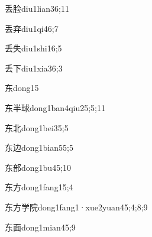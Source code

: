 \begin{verbete}{丢脸}{diu1lian3}{6;11}
\end{verbete}

\begin{verbete}{丢弃}{diu1qi4}{6;7}
\end{verbete}

\begin{verbete}{丢失}{diu1shi1}{6;5}
\end{verbete}

\begin{verbete}{丢下}{diu1xia3}{6;3}
\end{verbete}

\begin{verbete}{东}{dong1}{5}
\end{verbete}

\begin{verbete}{东半球}{dong1ban4qiu2}{5;5;11}
\end{verbete}

\begin{verbete}{东北}{dong1bei3}{5;5}
\end{verbete}

\begin{verbete}{东边}{dong1bian5}{5;5}
\end{verbete}

\begin{verbete}{东部}{dong1bu4}{5;10}
\end{verbete}

\begin{verbete}{东方}{dong1fang1}{5;4}
\end{verbete}

\begin{verbete}{东方学院}{dong1fang1·xue2yuan4}{5;4;8;9}
\end{verbete}

\begin{verbete}{东面}{dong1mian4}{5;9}
\end{verbete}

